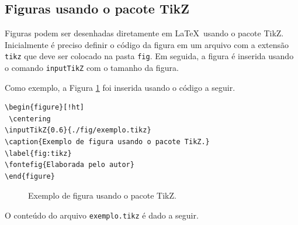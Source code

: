\subsection{Figuras usando o pacote TikZ}

Figuras podem ser desenhadas diretamente em \LaTeX\ usando o pacote TikZ. Inicialmente é preciso definir o código da figura em um arquivo com a extensão \verb|tikz| que deve ser colocado na pasta \verb|fig|. Em seguida, a figura é inserida usando o comando \verb|inputTikZ| com o tamanho da figura.

Como exemplo, a Figura \ref{fig:tikz} foi inserida usando o código a seguir.

\begin{verbatim}
\begin{figure}[!ht]
 \centering
\inputTikZ{0.6}{./fig/exemplo.tikz}
\caption{Exemplo de figura usando o pacote TikZ.}
\label{fig:tikz}
\fontefig{Elaborada pelo autor}
\end{figure}
\end{verbatim}

\begin{figure}[!ht]
 \centering
{}
\caption{Exemplo de figura usando o pacote TikZ.}
\label{fig:tikz}
\end{figure}

O conteúdo do arquivo \verb|exemplo.tikz| é dado a seguir.

